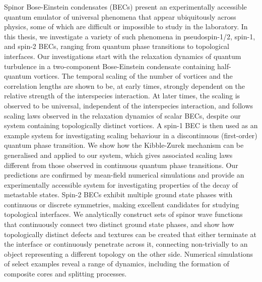 Spinor Bose-Einstein condensates (BECs) present an experimentally accessible
quantum emulator of universal phenomena that appear ubiquitously across physics,
some of which are difficult or impossible to study in the laboratory.
In this thesis, we investigate a variety of such phenomena in pseudospin-1/2,
spin-1, and spin-2 BECs, ranging from quantum phase transitions to topological
interfaces.
Our investigations start with the relaxation dynamics of quantum turbulence in a
two-component Bose-Einstein condensate containing half-quantum vortices.
The temporal scaling of the number of vortices and the correlation lengths are
shown to be, at early times, strongly dependent on the relative strength of the
interspecies interaction.
At later times, the scaling is observed to be universal, independent of the
interspecies interaction, and follows scaling laws observed in the relaxation
dynamics of scalar BECs, despite our system containing topologically distinct
vortices.
A spin-1 BEC is then used as an example system for investigating scaling
behaviour in a discontinuous (first-order) quantum phase transition.
We show how the Kibble-Zurek mechanism can be generalised and applied to our
system, which gives associated scaling laws different from those observed in
continuous quantum phase transitions.
Our predictions are confirmed by mean-field numerical simulations and provide an
experimentally accessible system for investigating properties of the decay of
metastable states.
Spin-2 BECs exhibit multiple ground state phases with continuous or discrete
symmetries, making excellent candidates for studying topological interfaces.
We analytically construct sets of spinor wave functions that continuously
connect two distinct ground state phases, and show how topologically distinct
defects and textures can be created that either terminate at the interface or
continuously penetrate across it, connecting non-trivially to an object
representing a different topology on the other side.
Numerical simulations of select examples reveal a range of dynamics, including
the formation of composite cores and splitting processes.